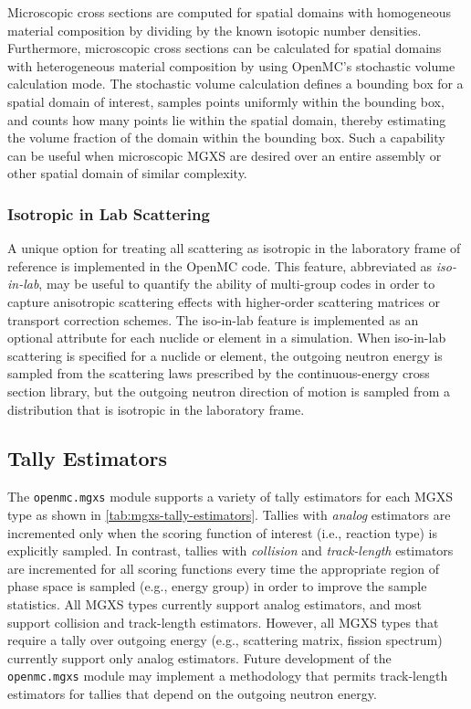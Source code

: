 Microscopic cross sections are computed for spatial domains with homogeneous material composition by dividing by the known isotopic number densities. Furthermore, microscopic cross sections can be calculated for spatial domains with heterogeneous material composition by using OpenMC's stochastic volume calculation mode. The stochastic volume calculation defines a bounding box for a spatial domain of interest, samples points uniformly within the bounding box, and counts how many points lie within the spatial domain, thereby estimating the volume fraction of the domain within the bounding box. Such a capability can be useful when microscopic MGXS are desired over an entire assembly or other spatial domain of similar complexity.

\subsubsection{Isotropic in Lab Scattering}
\label{subsec:iso-in-lab}

A unique option for treating all scattering as isotropic in the laboratory frame of reference is implemented in the OpenMC code. This feature, abbreviated as \emph{iso-in-lab}, may be useful to quantify the ability of multi-group codes in order to capture anisotropic scattering effects with higher-order scattering matrices or transport correction schemes. The iso-in-lab feature is implemented as an optional attribute for each nuclide or element in a simulation. When iso-in-lab scattering is specified for a nuclide or element, the outgoing neutron energy is sampled from the scattering laws prescribed by the continuous-energy cross section library, but the outgoing neutron direction of motion is sampled from a distribution that is isotropic in the laboratory frame.

\subsection{Tally Estimators}
\label{subsec:tally-est}

The \texttt{openmc.mgxs} module supports a variety of tally estimators for each MGXS type as shown in \cref{tab:mgxs-tally-estimators}. Tallies with \textit{analog} estimators are incremented only when the scoring function of interest (\textrm{i.e.}, reaction type) is explicitly sampled. In contrast, tallies with \textit{collision} and \textit{track-length} estimators are incremented for all scoring functions every time the appropriate region of phase space is sampled (\textrm{e.g.}, energy group) in order to improve the sample statistics. All MGXS types currently support analog estimators, and most support collision and track-length estimators. However, all MGXS types that require a tally over outgoing energy (\textrm{e.g.}, scattering matrix, fission spectrum) currently support only analog estimators. Future development of the \texttt{openmc.mgxs} module may implement a methodology\cite{nelson2014improved} that permits track-length estimators for tallies that depend on the outgoing neutron energy.

